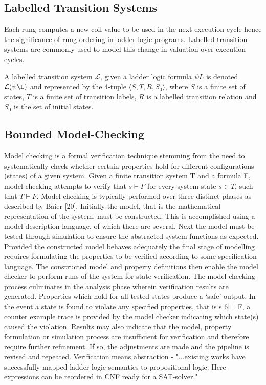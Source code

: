 \documentclass[runningheads]{llncs}
\begin{document}
\subsection{Labelled Transition Systems}
Each rung computes a new coil value to be used in the next execution cycle hence the significance of rung ordering in ladder logic programs. Labelled transition systems are commonly used to model this change in valuation over execution cycles.
\begin{definition}
	A labelled transition system $\mathcal{L}$, given a ladder logic formula $\psi L$ is denoted $\mathcal{L(\psi\L)}$ and represented by the 4-tuple $\langle S, T, R, S_0 \rangle$, where $S$ is a finite set of states, $T$ is a finite set of transition labels, $R$ is a labelled transition relation and $S_0$ is the set of initial states. 
\end{definition}

\subsection{Bounded Model-Checking}
Model checking is a formal verification technique stemming from the need to systematically
check whether certain properties hold for different configurations (states) of a given system.
Given a finite transition system T and a formula F, model checking attempts to verify
that $s \vdash F$ for every system state $s \in T$, such that $T \vdash F$. Model checking is typically
performed over three distinct phases as described by Baier [20]. Initially the model, that is
the mathematical representation of the system, must be constructed. This is accomplished
using a model description language, of which there are several. Next the model must
be tested through simulation to ensure the abstracted system functions as expected.
Provided the constructed model behaves adequately the final stage of modelling requires
formulating the properties to be verified according to some specification language. The
constructed model and property definitions then enable the model checker to perform runs
of the system for state verification. The model checking process culminates in the analysis
phase wherein verification results are generated. Properties which hold for all tested states
produce a ‘safe’ output. In the event a state is found to violate any specified properties, that
is s 6|= F, a counter example trace is provided by the model checker indicating which state(s)
caused the violation. Results may also indicate that the model, property formulation or
simulation process are insufficient for verification and therefore require further refinement.
If so, the adjustments are made and the pipeline is revised and repeated.
Verification means abstraction -  "...existing works have successfully mapped ladder logic semantics to propositional logic. Here expressions can be reordered in CNF ready for a SAT-solver."
\end{document}
